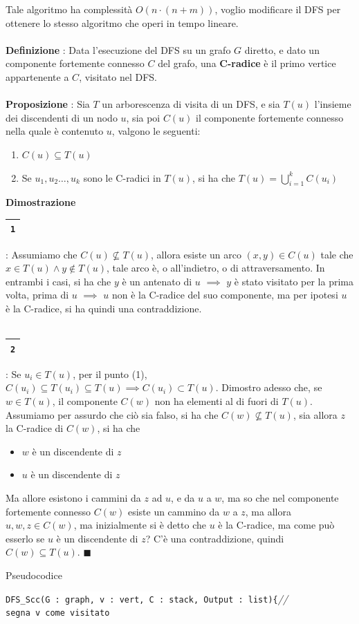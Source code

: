 \documentclass[12pt, letterpaper]{article}
\newcommand{\codee}[1]{\colorbox{white}{\texttt{#1}}}
\newcommand{\acc}{\\\hphantom{}\\}
\newcommand{\comm}[1]{\color{lg}\textit{\hphantom{spaz}// \text{#1}}\color{black}}
\newcommand{\boxedMath}[1]{\begin{tabular}{|c|}\hline \texttt{#1} \\ \hline\end{tabular} :}
\begin{document}
Tale algoritmo ha complessità $O(n\cdot(n+m))$, voglio modificare il DFS per ottenere lo stesso algoritmo che operi in 
tempo lineare.\acc 
\textbf{Definizione} : Data l'esecuzione del DFS su un grafo $G$ diretto, e dato un componente fortemente 
connesso $C$ del grafo, una \textbf{C-radice} è il primo vertice appartenente a $C$, visitato nel DFS.\acc 
\textbf{Proposizione} : Sia $T$ un arborescenza di visita di un DFS, e sia $T(u)$ l'insieme dei discendenti di un nodo 
$u$, sia poi $C(u)$ il componente fortemente connesso nella quale è contenuto $u$, valgono le seguenti:\begin{enumerate}
    \item $C(u)\subseteq T(u)$
    \item Se $u_1,u_2\dots,u_k$ sono le C-radici in $T(u)$, si ha che $\displaystyle T(u)=\bigcup_{i=1}^k C(u_i)$
\end{enumerate}
\textbf{Dimostrazione} \boxedMath{1} Assumiamo che $C(u)\nsubseteq  T(u)$, allora esiste un arco $(x,y)\in C(u)$ tale 
che $x\in T(u)\land y\notin T(u)$, tale arco è, o all'indietro, o di attraversamento. In entrambi i casi, si ha che 
$y$ è un antenato di $u$ $\implies$ $y$ è stato visitato per la prima volta, prima di $u$ $\implies$ $u$ non è la 
C-radice del suo componente, ma per ipotesi $u$ è la C-radice, si ha quindi una contraddizione.\acc
\boxedMath{2} Se $u_i\in T(u)$, per il punto (1), $C(u_i)\subseteq T(u_i) \subseteq T(u)\implies C(u_i)\subset T(u)$. Dimostro 
adesso che, 
se $w\in T(u)$, il componente $C(w)$ non ha elementi al di fuori di $T(u)$. Assumiamo per assurdo che ciò sia falso, si ha 
che $C(w)\nsubseteq T(u)$, sia allora $z$ la C-radice di $C(w)$, si ha che  \begin{itemize}
    \item $w$ è un discendente di $z$
    \item $u$ è un discendente di $z$
\end{itemize}
Ma allore esistono i cammini da $z$ ad $u$, e da $u$ a $w$, ma so che nel componente fortemente connesso $C(w)$ esiste 
un cammino da $w$ a $z$, ma allora $u,w,z\in C(w)$, ma inizialmente si è detto che $u$ è la C-radice, ma come può esserlo se 
$u$ è un discendente di $z$? C'è una contraddizione, quindi $C(w)\subseteq T(u)$. $\blacksquare$
\begin{center}
    Pseudocodice
\end{center}
\codee{DFS\_Scc(G : graph, v : vert, C : stack, Output : list)\{}\comm{chiamata ricorsiva}\\
\hphantom{ident}\codee{segna v come visitato}\\
\end{document}
